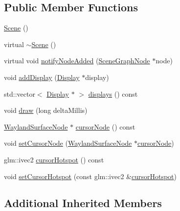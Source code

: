 \subsection*{Public Member Functions}
\begin{DoxyCompactItemize}
\item 
\hyperlink{classmotorcar_1_1Scene_ad10176d75a9cc0da56626f682d083507}{Scene} ()
\item 
virtual \hyperlink{classmotorcar_1_1Scene_a07ad90930bf4792b88c8ce8b6800df4d}{$\sim$\-Scene} ()
\item 
virtual void \hyperlink{classmotorcar_1_1Scene_a11f9f856df5db6db78760cae5dc02079}{notify\-Node\-Added} (\hyperlink{classmotorcar_1_1SceneGraphNode}{Scene\-Graph\-Node} $\ast$node)
\item 
void \hyperlink{classmotorcar_1_1Scene_a3482161400b2f552307cc70812b128a9}{add\-Display} (\hyperlink{classmotorcar_1_1Display}{Display} $\ast$display)
\item 
std\-::vector$<$ \hyperlink{classmotorcar_1_1Display}{Display} $\ast$ $>$ \hyperlink{classmotorcar_1_1Scene_a1c09a0e3e55f1dd870d5c3001890afa9}{displays} () const 
\item 
void \hyperlink{classmotorcar_1_1Scene_ae8c9484b131cf87e8b1ebca4500343ae}{draw} (long delta\-Millis)
\item 
\hyperlink{classmotorcar_1_1WaylandSurfaceNode}{Wayland\-Surface\-Node} $\ast$ \hyperlink{classmotorcar_1_1Scene_a124b886baea9b583feb477202c9038a2}{cursor\-Node} () const 
\item 
void \hyperlink{classmotorcar_1_1Scene_a76a501d972979ba633dd0e38b022ab9b}{set\-Cursor\-Node} (\hyperlink{classmotorcar_1_1WaylandSurfaceNode}{Wayland\-Surface\-Node} $\ast$\hyperlink{classmotorcar_1_1Scene_a124b886baea9b583feb477202c9038a2}{cursor\-Node})
\item 
glm\-::ivec2 \hyperlink{classmotorcar_1_1Scene_abdb097ab9a2927b447b2eee485d19d6e}{cursor\-Hotspot} () const 
\item 
void \hyperlink{classmotorcar_1_1Scene_aba832b6a205b06b9d266ee3302ff86f4}{set\-Cursor\-Hotspot} (const glm\-::ivec2 \&\hyperlink{classmotorcar_1_1Scene_abdb097ab9a2927b447b2eee485d19d6e}{cursor\-Hotspot})
\end{DoxyCompactItemize}
\subsection*{Additional Inherited Members}


